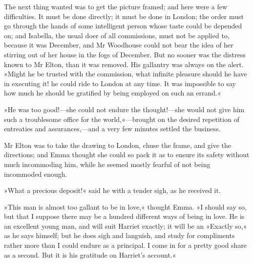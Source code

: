 The next thing wanted was to get the picture framed; and here were a few difficulties. It must be done directly; it must be done in London; the order must go through the hands of some intelligent person whose taste could be depended on; and Isabella, the usual doer of all commissions, must not be applied to, because it was December, and Mr Woodhouse could not bear the idea of her stirring out of her house in the fogs of December. But no sooner was the distress known to Mr Elton, than it was removed. His gallantry was always on the alert. »Might he be trusted with the commission, what infinite pleasure should he have in executing it! he could ride to London at any time. It was impossible to say how much he should be gratified by being employed on such an errand.«

»He was too good!—she could not endure the thought!—she would not give him such a troublesome office for the world,«—brought on the desired repetition of entreaties and assurances,—and a very few minutes settled the business.

Mr Elton was to take the drawing to London, chuse the frame, and give the directions; and Emma thought she could so pack it as to ensure its safety without much incommoding him, while he seemed mostly fearful of not being incommoded enough.

»What a precious deposit!« said he with a tender sigh, as he received it.

»This man is almost too gallant to be in love,« thought Emma. »I should say so, but that I suppose there may be a hundred different ways of being in love. He is an excellent young man, and will suit Harriet exactly; it will be an »Exactly so,« as he says himself; but he does sigh and languish, and study for compliments rather more than I could endure as a principal. I come in for a pretty good share as a second. But it is his gratitude on Harriet's account.«